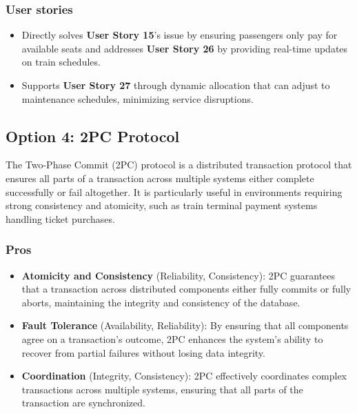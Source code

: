\subsubsection*{User stories}
\begin{itemize}
    \item Directly solves \textbf{User Story 15}'s issue by ensuring passengers only pay for available seats and addresses \textbf{User Story 26} by providing real-time updates on train schedules.
    \item Supports \textbf{User Story 27} through dynamic allocation that can adjust to maintenance schedules, minimizing service disruptions.
\end{itemize}

\subsection*{Option 4: 2PC Protocol}
The Two-Phase Commit (2PC) protocol is a distributed transaction protocol that ensures all parts of a transaction across multiple systems either complete successfully or fail altogether. It is particularly useful in environments requiring strong consistency and atomicity, such as train terminal payment systems handling ticket purchases.

\subsubsection*{Pros}
\begin{itemize}[noitemsep]
    \item \textbf{Atomicity and Consistency} (Reliability, Consistency): 2PC guarantees that a transaction across distributed components either fully commits or fully aborts, maintaining the integrity and consistency of the database.
    \item \textbf{Fault Tolerance} (Availability, Reliability): By ensuring that all components agree on a transaction's outcome, 2PC enhances the system's ability to recover from partial failures without losing data integrity.
    \item \textbf{Coordination} (Integrity, Consistency): 2PC effectively coordinates complex transactions across multiple systems, ensuring that all parts of the transaction are synchronized.
\end{itemize}


